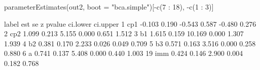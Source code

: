 \begin{Schunk}
\begin{Sinput}
 parameterEstimates(out2, 
                    boot = "bca.simple")[-c(7 : 18), -c(1 : 3)]
\end{Sinput}
\begin{Soutput}
   label    est    se      z pvalue ci.lower ci.upper
1    cp1 -0.103 0.190 -0.543  0.587   -0.480    0.276
2    cp2  1.099 0.213  5.155  0.000    0.651    1.512
3     b1  1.615 0.159 10.169  0.000    1.307    1.939
4     b2  0.381 0.170  2.233  0.026    0.049    0.709
5     b3  0.571 0.163  3.516  0.000    0.258    0.880
6      a  0.741 0.137  5.408  0.000    0.440    1.003
19   imm  0.424 0.146  2.900  0.004    0.182    0.768
\end{Soutput}
\end{Schunk}
